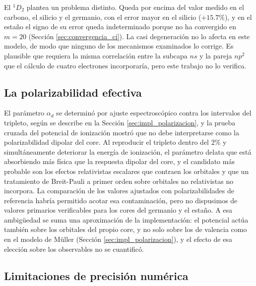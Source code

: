 El $^1D_2$ plantea un problema distinto. Queda por encima del valor medido en el carbono, el silicio y el germanio, con el error mayor en el silicio ($+15.7\%$), y en el estaño el signo de su error queda indeterminado porque no ha convergido en $m=20$ (Sección \ref{sec:convergencia_ci}). La casi degeneración no lo afecta en este modelo, de modo que ninguno de los mecanismos examinados lo corrige. Es plausible que requiera la misma correlación entre la subcapa $ns$ y la pareja $np^2$ que el cálculo de cuatro electrones incorporaría, pero este trabajo no lo verifica.

\subsection{La polarizabilidad efectiva}

El parámetro $\alpha_d$ se determinó por ajuste espectroscópico contra los intervalos del tripleto, según se describe en la Sección \ref{sec:impl_polarizacion}, y la prueba cruzada del potencial de ionización mostró que no debe interpretarse como la polarizabilidad dipolar del core. Al reproducir el tripleto dentro del $2\%$ y simultáneamente deteriorar la energía de ionización, el parámetro delata que está absorbiendo más física que la respuesta dipolar del core, y el candidato más probable son los efectos relativistas escalares que contraen los orbitales y que un tratamiento de Breit-Pauli a primer orden sobre orbitales no relativistas no incorpora. La comparación de los valores ajustados con polarizabilidades de referencia habría permitido acotar esa contaminación, pero no dispusimos de valores primarios verificables para los cores del germanio y el estaño. A esa ambigüedad se suma una aproximación de la implementación: el potencial actúa también sobre los orbitales del propio core, y no solo sobre los de valencia como en el modelo de Müller (Sección \ref{sec:impl_polarizacion}), y el efecto de esa elección sobre los observables no se cuantificó.

\subsection{Limitaciones de precisión numérica}

